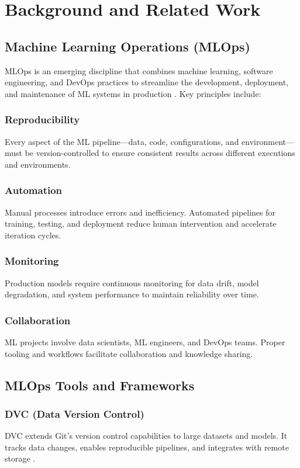 \section{Background and Related Work}

\subsection{Machine Learning Operations (MLOps)}

MLOps is an emerging discipline that combines machine learning, software engineering, and DevOps practices to streamline the development, deployment, and maintenance of ML systems in production \cite{sculley2015hidden}. Key principles include:

\subsubsection{Reproducibility}
Every aspect of the ML pipeline—data, code, configurations, and environment—must be version-controlled to ensure consistent results across different executions and environments.

\subsubsection{Automation}
Manual processes introduce errors and inefficiency. Automated pipelines for training, testing, and deployment reduce human intervention and accelerate iteration cycles.

\subsubsection{Monitoring}
Production models require continuous monitoring for data drift, model degradation, and system performance to maintain reliability over time.

\subsubsection{Collaboration}
ML projects involve data scientists, ML engineers, and DevOps teams. Proper tooling and workflows facilitate collaboration and knowledge sharing.

\subsection{MLOps Tools and Frameworks}

\subsubsection{DVC (Data Version Control)}
DVC extends Git's version control capabilities to large datasets and models. It tracks data changes, enables reproducible pipelines, and integrates with remote storage \cite{dvc2020}.

